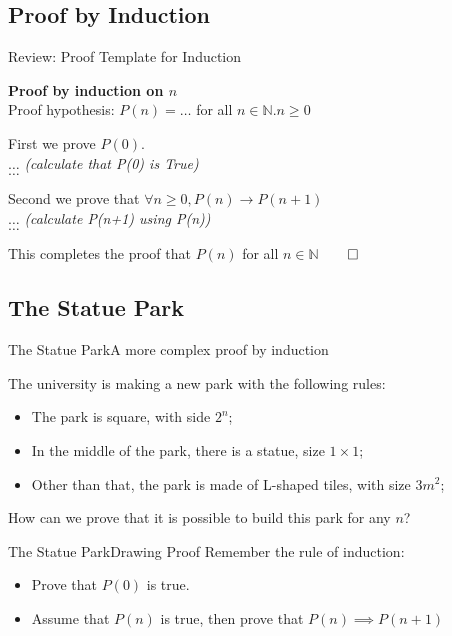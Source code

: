 \subsection{Proof by Induction}
\begin{frame}[t]{Review: Proof Template for Induction}

  {\larger
    {\bf Proof by induction on $n$}\\
    Proof hypothesis: $P(n) = \ldots$ for all $n \in \mathbb{N}. n \geq 0$\\

    \bigskip

    First we prove $P(0)$.\\
    $\ldots$ \emph{(calculate that P(0) is True)}\\
    $\ldots$\\

    \bigskip

    Second we prove that $\forall n \geq 0, P(n) \rightarrow P(n+1)$\\
    $\ldots$ \emph{(calculate P(n+1) using P(n))}\\
    $\ldots$\\

    \bigskip

    This completes the proof that $P(n)$ for all $n\in\mathbb{N}$\hfill$\qed$
  }
\end{frame}

\subsection{The Statue Park}

\begin{frame}[t]{The Statue Park}{A more complex proof by induction}

  The university is making a new park with the following rules:
  \begin{itemize}
    \item The park is square, with side $2^n$;
    \item In the middle of the park, there is a statue, size $1\times 1$;
    \item Other than that, the park is made of L-shaped tiles, with size $3m^2$;
  \end{itemize}\bigskip

  How can we prove that it is possible to build this park for any $n$?
\end{frame}

\begin{frame}[t]{The Statue Park}{Drawing Proof}
  Remember the rule of induction:
  \begin{itemize}
    \item Prove that $P(0)$ is true.
    \item Assume that $P(n)$ is true, then prove that $P(n) \implies P(n+1)$
  \end{itemize}
\end{frame}


